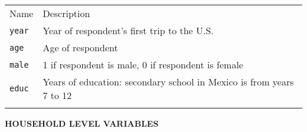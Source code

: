 \documentclass[]{article}
\begin{document}
\begin{longtable}[c]{@{}ll@{}}
\toprule\addlinespace
\begin{minipage}[b]{0.39\columnwidth}\raggedright
Name
\end{minipage} & \begin{minipage}[b]{0.54\columnwidth}\raggedright
Description
\end{minipage}
\\\addlinespace
\midrule\endhead
\begin{minipage}[t]{0.39\columnwidth}\raggedright
\texttt{year}
\end{minipage} & \begin{minipage}[t]{0.54\columnwidth}\raggedright
Year of respondent's first trip to the U.S.
\end{minipage}
\\\addlinespace
\begin{minipage}[t]{0.39\columnwidth}\raggedright
\texttt{age}
\end{minipage} & \begin{minipage}[t]{0.54\columnwidth}\raggedright
Age of respondent
\end{minipage}
\\\addlinespace
\begin{minipage}[t]{0.39\columnwidth}\raggedright
\texttt{male}
\end{minipage} & \begin{minipage}[t]{0.54\columnwidth}\raggedright
1 if respondent is male, 0 if respondent is female
\end{minipage}
\\\addlinespace
\begin{minipage}[t]{0.39\columnwidth}\raggedright
\texttt{educ}
\end{minipage} & \begin{minipage}[t]{0.54\columnwidth}\raggedright
Years of education: secondary school in Mexico is from years 7 to 12
\end{minipage}
\\\addlinespace
\bottomrule
\end{longtable}

\textbf{HOUSEHOLD LEVEL VARIABLES}
\end{document}
